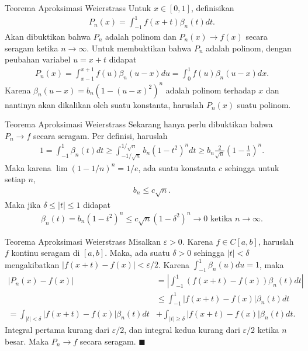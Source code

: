 \documentclass[xcolor={dvipsnames}, 9pt]{beamer}
\begin{document}
    \begin{frame}{Teorema Aproksimasi Weierstrass}
        Untuk $x\in[0,1]$, definisikan
        \begin{align*}
            P_n(x) = \int_{-1}^1 f(x+t)\beta_n(t) dt.
        \end{align*}
        Akan dibuktikan bahwa $P_n$ adalah polinom dan $P_n(x)\to f(x)$ secara seragam ketika $n\to\infty$. \newline
        Untuk membuktikan bahwa $P_n$ adalah polinom, dengan peubahan variabel $u=x+t$ didapat
        \begin{align*}
            P_n(x) = \int_{x-1}^{x+1}f(u)\beta_n(u-x)du=\int_0^1 f(u)\beta_n(u-x) dx.
        \end{align*}
        Karena $\beta_n(u-x)=b_n(1-(u-x)^2)^n$ adalah polinom terhadap $x$ dan nantinya akan dikalikan oleh suatu konstanta, haruslah $P_n(x)$ suatu polinom.
    \end{frame}
    \begin{frame}{Teorema Aproksimasi Weierstrass}
        Sekarang hanya perlu dibuktikan bahwa $P_n\to f$ secara seragam. Per definisi, haruslah
        \begin{align*}
            1=\int_{-1}^1 \beta_n(t)dt \geq \int_{-1/\sqrt{n}}^{1/\sqrt{n}} b_n(1-t^2)^n dt \geq b_n \frac{2}{\sqrt{n}}\left(1-\frac{1}{n}\right)^n.
        \end{align*}
        Maka karena $\lim (1-1/n)^n = 1/e$, ada suatu konstanta $c$ sehingga untuk setiap $n$,
        \begin{align*}
            b_n \leq c\sqrt{n}.
        \end{align*}
        Maka jika $\delta\leq|t|\leq 1$ didapat
        \begin{align*}
            \beta_n(t) = b_n(1-t^2)^n \leq c\sqrt{n}(1-\delta^2)^n\to 0 \text{ ketika } n\to\infty.
        \end{align*}
    \end{frame}
    \begin{frame}{Teorema Aproksimasi Weierstrass}
        Misalkan $\varepsilon>0$. Karena $f\in C[a,b]$, haruslah $f$ kontinu seragam di $[a,b]$. Maka, ada suatu $\delta>0$ sehingga $|t|<\delta$ mengakibatkan $|f(x+t)-f(x)|<\varepsilon/2$. Karena $\int_{-1}^{1} \beta_n(u) du = 1$, maka
        \begin{align*}
            |P_n(x)-f(x)| &= \left|\int_{-1}^1 (f(x+t)-f(x))\beta_n(t) dt\right| \\
            &\leq \int_{-1}^1 |f(x+t)-f(x)|\beta_n(t) dt \\
            = \int_{|t|<\delta} |f(x+t)-f(x)|\beta_n(t) dt &+\int_{|t|\geq\delta} |f(x+t)-f(x)|\beta_n(t) dt.
        \end{align*}
        Integral pertama kurang dari $\varepsilon/2$, dan integral kedua kurang dari $\varepsilon/2$ ketika $n$ besar. Maka $P_n\to f$ secara seragam. $\blacksquare$
    \end{frame}
\end{document}
